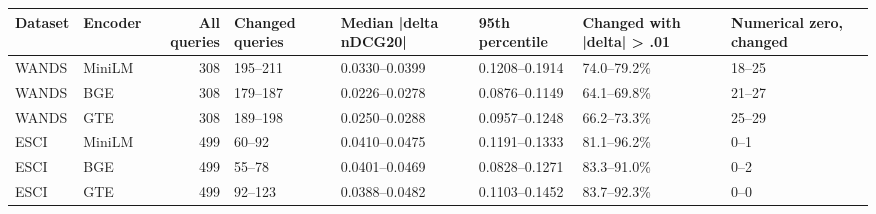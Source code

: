 \begin{tabular}{llrlllll}
\toprule
Dataset & Encoder & All queries & Changed queries & Median |delta nDCG20| & 95th percentile & Changed with |delta| > .01 & Numerical zero, changed \\
\midrule
WANDS & MiniLM & 308 & 195–211 & 0.0330–0.0399 & 0.1208–0.1914 & 74.0–79.2\% & 18–25 \\
WANDS & BGE & 308 & 179–187 & 0.0226–0.0278 & 0.0876–0.1149 & 64.1–69.8\% & 21–27 \\
WANDS & GTE & 308 & 189–198 & 0.0250–0.0288 & 0.0957–0.1248 & 66.2–73.3\% & 25–29 \\
ESCI & MiniLM & 499 & 60–92 & 0.0410–0.0475 & 0.1191–0.1333 & 81.1–96.2\% & 0–1 \\
ESCI & BGE & 499 & 55–78 & 0.0401–0.0469 & 0.0828–0.1271 & 83.3–91.0\% & 0–2 \\
ESCI & GTE & 499 & 92–123 & 0.0388–0.0482 & 0.1103–0.1452 & 83.7–92.3\% & 0–0 \\
\bottomrule
\end{tabular}
